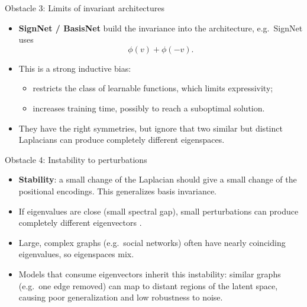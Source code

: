 \documentclass[aspectratio=169,11pt]{beamer}
\begin{document}
\begin{frame}{Obstacle 3: Limits of invariant architectures}
  \begin{itemize}
    \item \textbf{SignNet / BasisNet} \citep{lim2023sign} build the invariance
          into the architecture, e.g.\ SignNet uses
          \begin{equation*}
            \phi(v) + \phi(-v).
          \end{equation*}
    \item This is a \alert{strong inductive bias}:
          \begin{itemize}
            \item restricts the class of learnable functions, which limits expressivity;
            \item increases training time, possibly to reach a suboptimal solution.
          \end{itemize}
    \item They have the right symmetries, but ignore that two \alert{similar
          but distinct} Laplacians can produce completely different eigenspaces.
  \end{itemize}
\end{frame}

\begin{frame}{Obstacle 4: Instability to perturbations}
  \begin{itemize}
    \item \textbf{Stability}: a small change of the Laplacian should give a
          small change of the positional encodings. This generalizes basis
          invariance.
    \item If eigenvalues are close (small \alert{spectral gap}), small
          perturbations can produce completely different eigenvectors
          \citep[Lemma~3.4]{wang2022equivariant}.
    \item Large, complex graphs (e.g.\ social networks) often have nearly
          coinciding eigenvalues, so eigenspaces mix.
    \item Models that consume eigenvectors \alert{inherit this instability}:
          similar graphs (e.g.\ one edge removed) can map to distant regions of
          the latent space, causing poor generalization and low robustness to
          noise.
  \end{itemize}
\end{frame}
\end{document}
